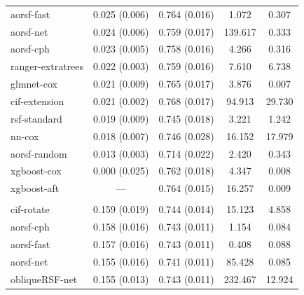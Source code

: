 \documentclass{article}\usepackage[]{graphicx}\usepackage[]{xcolor}
\newenvironment{knitrout}{}{} %
\begin{document}
\begin{knitrout}
\begin{longtable}[t]{lcccc}
\hspace{1em}aorsf-fast & 0.025 (0.006) & 0.764 (0.016) & 1.072 & 0.307\\
\hspace{1em}aorsf-net & 0.024 (0.006) & 0.759 (0.017) & 139.617 & 0.333\\
\hspace{1em}aorsf-cph & 0.023 (0.005) & 0.758 (0.016) & 4.266 & 0.316\\
\hspace{1em}ranger-extratrees & 0.022 (0.003) & 0.759 (0.016) & 7.610 & 6.738\\
\hspace{1em}glmnet-cox & 0.021 (0.009) & 0.765 (0.017) & 3.876 & 0.007\\
\hspace{1em}cif-extension & 0.021 (0.002) & 0.768 (0.017) & 94.913 & 29.730\\
\hspace{1em}rsf-standard & 0.019 (0.009) & 0.745 (0.018) & 3.221 & 1.242\\
\hspace{1em}nn-cox & 0.018 (0.007) & 0.746 (0.028) & 16.152 & 17.979\\
\hspace{1em}aorsf-random & 0.013 (0.003) & 0.714 (0.022) & 2.420 & 0.343\\
\hspace{1em}xgboost-cox & 0.000 (0.025) & 0.762 (0.018) & 4.347 & 0.008\\
\hspace{1em}xgboost-aft & --- & 0.764 (0.015) & 16.257 & 0.009\\
\addlinespace[0.3em]
\multicolumn{5}{l}{\textit{\textbf{Monoclonal gammopathy; death, n = 1384, p = 8}}}\\
\hline
\hspace{1em}cif-rotate & 0.159 (0.019) & 0.744 (0.014) & 15.123 & 4.858\\
\hspace{1em}aorsf-cph & 0.158 (0.016) & 0.743 (0.011) & 1.154 & 0.084\\
\hspace{1em}aorsf-fast & 0.157 (0.016) & 0.743 (0.011) & 0.408 & 0.088\\
\hspace{1em}aorsf-net & 0.155 (0.016) & 0.741 (0.011) & 85.428 & 0.085\\
\hspace{1em}obliqueRSF-net & 0.155 (0.013) & 0.743 (0.011) & 232.467 & 12.924\\

\end{longtable}
\end{knitrout}
\end{document}

